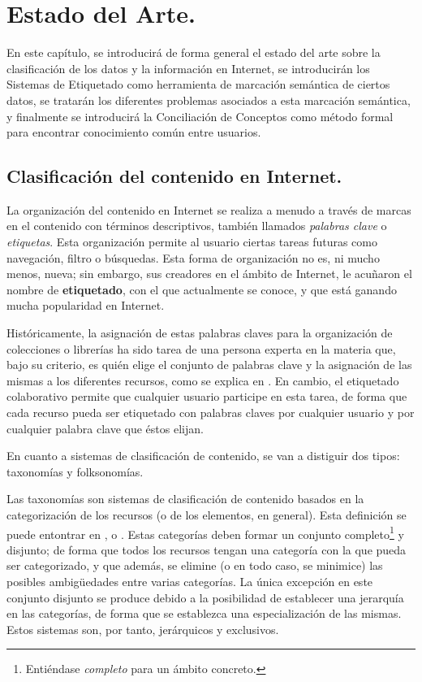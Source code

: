 \chapter{Estado del Arte.}\label{cap:capitulo1}

En este capítulo, se introducirá de forma general el estado del arte sobre la clasificación de los datos y la información en Internet, se introducirán los Sistemas de Etiquetado como herramienta de marcación semántica de ciertos datos, se tratarán los diferentes problemas asociados a esta marcación semántica, y finalmente se introducirá la Conciliación de Conceptos como método formal para encontrar conocimiento común entre usuarios.


\section{Clasificación del contenido en Internet.}

La organización del contenido en Internet se realiza a menudo a través de marcas en el contenido con términos descriptivos, también llamados \emph{palabras clave} o \emph{etiquetas}. Esta organización permite al usuario ciertas tareas futuras como navegación, filtro o búsquedas. Esta forma de organización no es, ni mucho menos, nueva; sin embargo, sus creadores en el ámbito de Internet, le acuñaron el nombre de {\bf etiquetado}, con el que actualmente se conoce, y que está ganando mucha popularidad en Internet.

Históricamente, la asignación de estas palabras claves para la organización de colecciones o librerías ha sido tarea de una persona experta en la materia que, bajo su criterio, es quién elige el conjunto de palabras clave y la asignación de las mismas a los diferentes recursos, como se explica en \cite{rowley}. En cambio, el etiquetado colaborativo permite que cualquier usuario participe en esta tarea, de forma que cada recurso pueda ser etiquetado con palabras claves por cualquier usuario y por cualquier palabra clave que éstos elijan.

En cuanto a sistemas de clasificación de contenido, se van a distiguir dos tipos: taxonomías y folksonomías.

Las taxonomías son sistemas de clasificación de contenido basados en la categorización de los recursos (o de los elementos, en general). Esta definición se puede entontrar en \cite{smith}, \cite{kim} o \cite{golder}. Estas categorías deben formar un conjunto completo\footnote{Entiéndase \emph{completo} para un ámbito concreto.} y disjunto; de forma que todos los recursos tengan una categoría con la que pueda ser categorizado, y que además, se elimine (o en todo caso, se minimice) las posibles ambigüedades entre varias categorías. La única excepción en este conjunto disjunto se produce debido a la posibilidad de establecer una jerarquía en las categorías, de forma que se establezca una especialización de las mismas. Estos sistemas son, por tanto, jerárquicos y exclusivos. 

